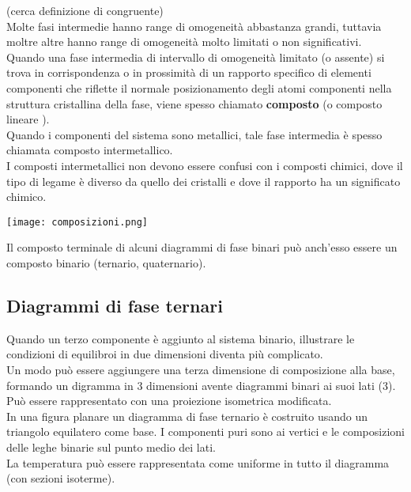 \documentclass{article}
\begin{document}
(cerca definizione di congruente)\\

Molte fasi intermedie hanno range di omogeneità abbastanza grandi, tuttavia moltre altre hanno range di omogeneità molto limitati o non significativi. \\
Quando una fase intermedia di intervallo di omogeneità limitato (o assente) si trova in corrispondenza o in prossimità di un rapporto specifico di elementi componenti che riflette il normale posizionamento degli atomi componenti nella struttura cristallina della fase, viene spesso chiamato \textbf{composto} (o composto lineare ).
\\
Quando i componenti del sistema sono metallici, tale fase intermedia è spesso chiamata composto intermetallico. 
\\
I composti intermetallici non devono essere confusi con i composti chimici, dove il tipo di legame è diverso da quello dei cristalli e dove il rapporto ha un significato chimico.
\begin{center}
    \texttt{[image: composizioni.png]}
\end{center}
Il composto terminale di alcuni diagrammi di fase binari può anch'esso essere un composto binario (ternario, quaternario).


\subsection{Diagrammi di fase ternari}
Quando un terzo componente è aggiunto al sistema binario, illustrare le condizioni di equilibroi in due dimensioni diventa più complicato. \\
Un modo può essere aggiungere una terza dimensione di composizione alla base, formando un digramma in 3 dimensioni avente diagrammi binari ai suoi lati (3). Può essere rappresentato con una proiezione isometrica modificata. \\
In una figura planare un diagramma di fase ternario è costruito usando un triangolo equilatero come base. I componenti puri sono ai vertici e le composizioni delle leghe binarie sul punto medio dei lati. 
\\ La temperatura può essere rappresentata come uniforme in tutto il diagramma (con sezioni isoterme).
\end{document}

